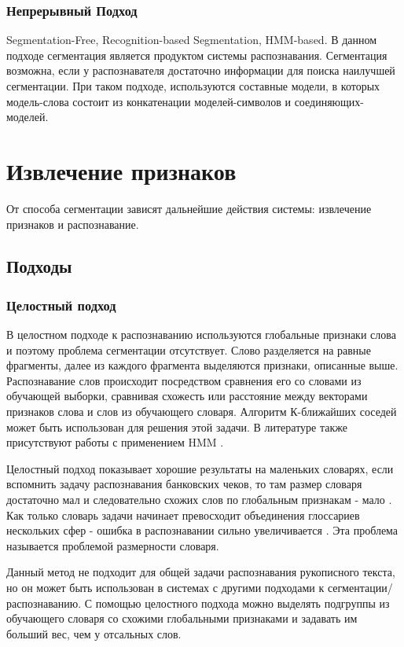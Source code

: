 \subsubsection{Непрерывный Подход}

Segmentation-Free, Recognition-based Segmentation, HMM-based. В данном подходе сегментация является продуктом системы распознавания. Сегментация возможна, если у распознавателя достаточно информации для поиска наилучшей сегментации. При таком подходе, используются составные модели, в которых модель-слова состоит из конкатенации моделей-символов и соединяющих-моделей. 


\section{Извлечение признаков}

От способа сегментации зависят дальнейшие действия системы: извлечение признаков и распознавание.

\subsection{Подходы}
\subsubsection{Целостный подход}
В целостном подходе к распознаванию используются глобальные признаки слова и поэтому проблема сегментации отсутствует. Слово разделяется на равные фрагменты, далее из каждого фрагмента выделяются признаки, описанные выше. Распознавание слов происходит посредством сравнения его со словами из обучающей выборки, сравнивая схожесть или расстояние между векторами признаков слова и слов из обучающего словаря. Алгоритм К-ближайших соседей может быть использован для решения этой задачи. В литературе также присутствуют работы с применением HMM \cite{lavrenko2004holistic}.

Целостный подход показывает хорошие результаты на маленьких словарях, если вспомнить задачу распознавания банковских чеков, то там размер словаря достаточно мал и следовательно схожих слов по глобальным признакам - мало \cite{guillevic1995unconstrained} . Как только словарь задачи начинает превосходит объединения глоссариев нескольких сфер - ошибка в распознавании сильно увеличивается \cite{rehman2012off}. Эта проблема называется проблемой размерности словаря.

Данный метод не подходит для общей задачи распознавания рукописного текста, но он может быть использован в системах с другими подходами к сегментации/распознаванию. С помощью целостного подхода можно выделять подгруппы из обучающего словаря со схожими глобальными признаками и задавать им больший вес, чем у отсальных слов.

